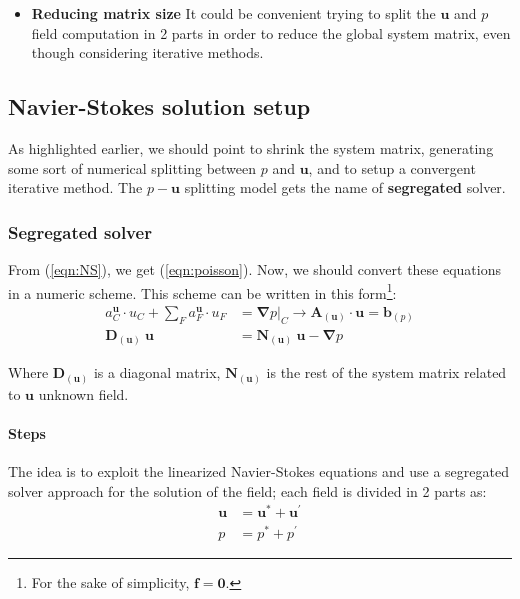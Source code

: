 \begin{itemize}
\begin{itemize}
        \item \textbf{Reducing matrix size} It could be convenient trying to split the $\boldsymbol{u}$ and $p$ field computation in 2 parts in order to reduce the global system matrix, even though considering iterative methods.
        \end{itemize}
\end{itemize}

\subsection{Navier-Stokes solution setup}
As highlighted earlier, we should point to shrink the system matrix, generating some sort of numerical splitting between $p$ and $\boldsymbol{u}$, and to setup a convergent iterative method. The $p - \boldsymbol{u}$ splitting model gets the name of \textbf{segregated} solver. 

\subsubsection{Segregated solver}
From (\ref{eqn:NS}), we get (\ref{eqn:poisson}). Now, we should convert these equations in a numeric scheme. This scheme can be written in this form\footnote{For the sake of simplicity, $\boldsymbol{f} = \boldsymbol{0}$.}: 
\begin{align}
    a_C^{\boldsymbol{u}} \cdot u_{C} + \sum_{F} a_F^{\boldsymbol{u}} \cdot u_{F} & = \boldsymbol{\nabla} p \Big|_{C} \rightarrow \boldsymbol{A}_{(\boldsymbol{u})} \cdot \boldsymbol{u} = \boldsymbol{b}_{(p)} \\ 
    \boldsymbol{D}_{(\boldsymbol{u})} \ \boldsymbol{u} & = \boldsymbol{N}_{(\boldsymbol{u})} \ \boldsymbol{u} - \boldsymbol{\nabla} p
    \label{eqn:LINsys}
\end{align}

\noindent Where $\boldsymbol{D}_{(\boldsymbol{u})}$ is a diagonal matrix, $\boldsymbol{N}_{(\boldsymbol{u})}$ is the rest of the system matrix related to $\boldsymbol{u}$ unknown field.

\paragraph{Steps}
The idea is to exploit the linearized Navier-Stokes equations and use a segregated solver approach for the solution of the field; each field is divided in 2 parts as:
\begin{align}
    \boldsymbol{u} & = \boldsymbol{u}^* + \boldsymbol{u}^{\prime} \label{eqn:uvariableSplit}\\ 
                 p & = p^* + p^{\prime}
    \label{eqn:pvariableSplit}
\end{align}

